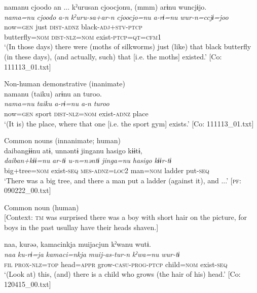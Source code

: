 {\TM}
\glll namanu  cjoodo  an ...  kˀurusan   cjoocjonu,  (mmm)  arɨnu  wuncjɨjo.\\
      \textit{nama=nu}  \textit{cjoodo}  \textit{a-n}  \textit{kˀuru-sa+ar-n}   \textit{cjoocjo=nu}    \textit{a-rɨ=nu}  \textit{wur-n=ccjɨ=joo}\\
      now=\textsc{gen}  just  \textsc{dist}-\textsc{adnz}  black-\textsc{adj}+\textsc{stv}-\textsc{ptcp}\\  butterfly=\textsc{nom}    \textsc{dist}-\textsc{nlz}=\textsc{nom}  exist-\textsc{ptcp}=\textsc{qt}=\textsc{cfm}1\\
\glt ‘(In those days) there were (moths of silkworms) just (like) that black butterfly (in these days), (and actually, such) that [i.e. the moths] existed.’ [Co: 111113\_01.txt]

\ex Non-human demonstrative (inanimate)\\
{\TM}
\glll  namanu  ({\textbar}taiku{\textbar})  arɨnu  an  turoo.\\
\textit{nama=nu}  \textit{taiku}  \textit{a-rɨ=nu}  \textit{a-n}  \textit{turoo}\\
now=\textsc{gen}  sport  \textsc{dist}-\textsc{nlz}=\textsc{nom}  exist-\textsc{adnz}  place\\
\glt ‘(It is) the place, where that one [i.e. the sport gym] exists.’ [Co: 111113\_01.txt]

\ex Common nouns (innanimate; human)\\
{\TM}
\glll  daibangɨɨnu  atɨ,  unnəntɨ  jinganu  {\textbar}hasigo{\textbar}   kɨɨtɨ,\\
\textit{daiban+kɨɨ=nu}  \textit{ar-tɨ}  \textit{u-n=nəntɨ}  \textit{jinga=nu}  \textit{hasigo}      \textit{kɨɨr-tɨ}\\
big+tree=\textsc{nom}  exist-\textsc{seq}  \textsc{mes}-\textsc{adnz}=\textsc{loc2}  man=\textsc{nom}  ladder  put-\textsc{seq}\\
\glt ‘There was a big tree, and there a man put a ladder (against it), and ...’ [\textsc{pf}: 090222\_00.txt]

\ex Common noun (human)\\{}
[Context: \textsc{tm} was surprised there was a boy with short hair on the picture, for boys in the past usullay have their heads shaven.]

{\TM}
\glll naa,  kurəə,  kamacinkja  muijacjun     kˀwanu  wutɨ.\\
      \textit{naa}  \textit{ku-rɨ=ja}  \textit{kamaci=nkja}  \textit{muij-as-tur-n}    \textit{kˀwa=nu}  \textit{wur-tɨ}\\
      \textsc{fil}  \textsc{prox}-\textsc{nlz}=\textsc{top}  head=\textsc{appr}  grow-\textsc{casu}-\textsc{prog}-\textsc{ptcp}      child=\textsc{nom}  exist-\textsc{seq}\\
\glt ‘(Look at) this, (and) there is a child who grows (the hair of his) head.’ [Co: 120415\_00.txt]
\z
\z

